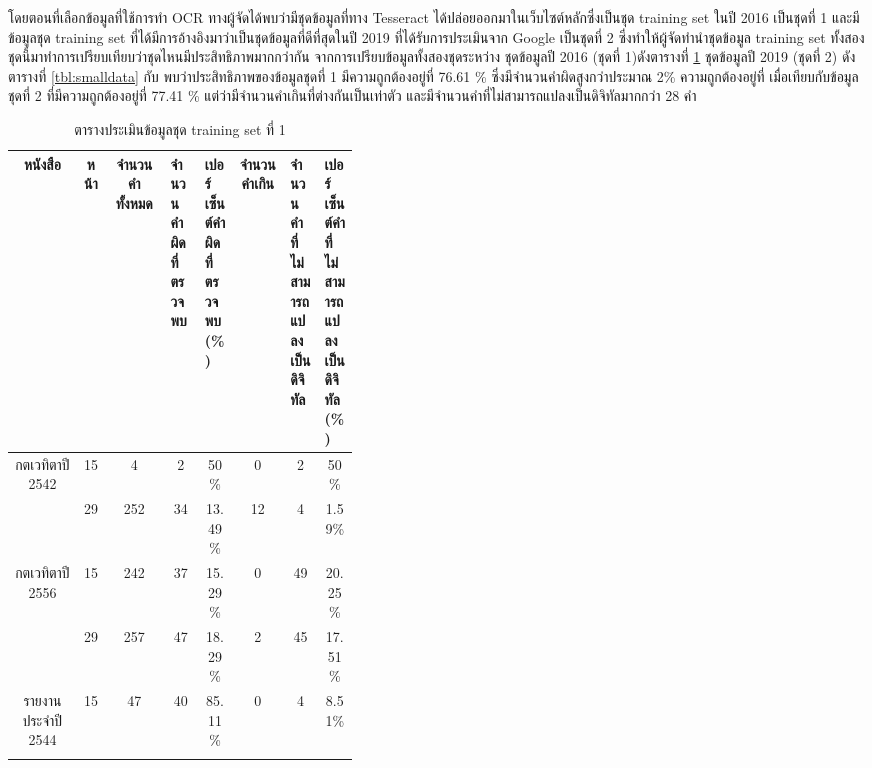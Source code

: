 โดยตอนที่เลือกข้อมูลที่ใช้การทำ OCR ทางผู้จัดได้พบว่ามีชุดข้อมูลที่ทาง Tesseract ได้ปล่อยออกมาในเว็บไซต์หลักซึ่งเป็นชุด training set ในปี 2016 เป็นชุดที่ 1
และมีข้อมูลชุด training set ที่ได้มีการอ้างอิงมาว่าเป็นชุดข้อมูลที่ดีที่สุดในปี 2019 ที่ได้รับการประเมินจาก Google เป็นชุดที่ 2
ซึ่งทำให้ผู้จัดทำนำชุดข้อมูล training set ทั้งสองชุดนี้มาทำการเปรียบเทียบว่าชุดไหนมีประสิทธิภาพมากกว่ากัน
จากการเปรียบข้อมูลทั้งสองชุดระหว่าง ชุดข้อมูลปี 2016 (ชุดที่ 1)ดังตารางที่ \ref{tbl:bigdata} ชุดข้อมูลปี 2019 (ชุดที่ 2) ดังตารางที่ \ref{tbl:smalldata} กับ
พบว่าประสิทธิภาพของข้อมูลชุดที่ 1 มีความถูกต้องอยู่ที่ 76.61 \% ซึ่งมีจำนวนคำผิดสูงกว่าประมาณ 2\% ความถูกต้องอยู่ที่ 
เมื่อเทียบกับข้อมูลชุดที่ 2 ที่มีความถูกต้องอยู่ที่ 77.41 \% แต่ว่ามีจำนวนคำเกินที่ต่างกันเป็นเท่าตัว 
และมีจำนวนคำที่ไม่สามารถแปลงเป็นดิจิทัลมากกว่า 28 คำ

\begin{table}[H]
    \caption{ตารางประเมินข้อมูลชุด training set ที่ 1}\label{tbl:bigdata}
    \begin{tabular}{|c|c|c|p{0.1\linewidth}|p{0.1\linewidth}|c|p{0.1\linewidth}|p{0.1\linewidth}|}
            \hline
            หนังสือ                             & หน้า  & จำนวนคำทั้งหมด & จำนวนคำผิดที่ตรวจพบ & เปอร์เซ็นต์คำผิดที่ตรวจพบ(\%)    & จำนวนคำเกิน & จำนวนคำที่ไม่สามารถแปลงเป็นดิจิทัล & เปอร์เซ็นต์คำที่ไม่สามารถแปลงเป็นดิจิทัล(\%)    \\ \hline
            \multirow{2}{*}{กตเวทิตาปี 2542}      & 15    & 4         & \multicolumn{1}{c|}{2  }         & \multicolumn{1}{c|}{50\%   } & \multicolumn{1}{c|}{0 }     & \multicolumn{1}{c|}{2  }             & \multicolumn{1}{c|}{50\%   } \\ \cline{2-8} 
                                                & 29    & 252       & \multicolumn{1}{c|}{34 }         & \multicolumn{1}{c|}{13.49\%} & \multicolumn{1}{c|}{12}     & \multicolumn{1}{c|}{4  }             & \multicolumn{1}{c|}{1.59\% } \\ \hline
            \multirow{2}{*}{กตเวทิตาปี 2556}      & 15    & 242       & \multicolumn{1}{c|}{37 }         & \multicolumn{1}{c|}{15.29\%} & \multicolumn{1}{c|}{0 }     & \multicolumn{1}{c|}{49 }             & \multicolumn{1}{c|}{20.25\%} \\ \cline{2-8} 
                                                & 29    & 257       & \multicolumn{1}{c|}{47 }         & \multicolumn{1}{c|}{18.29\%} & \multicolumn{1}{c|}{2 }     & \multicolumn{1}{c|}{45 }             & \multicolumn{1}{c|}{17.51\%} \\ \hline
            \multirow{2}{*}{รายงานประจำปี 2544}   & 15    & 47        & \multicolumn{1}{c|}{40 }         & \multicolumn{1}{c|}{85.11\%} & \multicolumn{1}{c|}{0 }     & \multicolumn{1}{c|}{4  }             & \multicolumn{1}{c|}{8.51\% } \\ \cline{2-8} 

\end{tabular}
\end{table}
